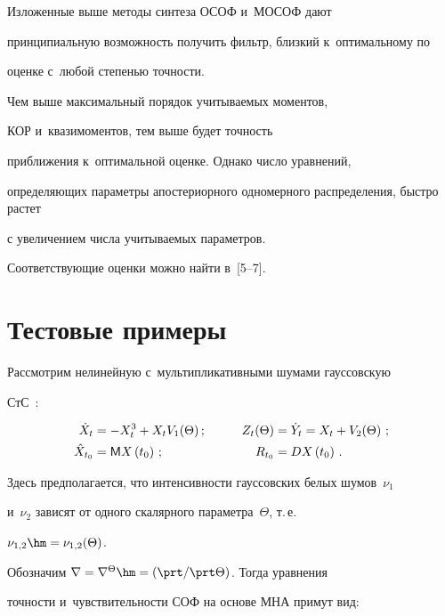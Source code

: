 Изложенные выше методы синтеза ОСОФ и~МОСОФ дают

принципиальную возможность получить фильтр, близкий к~оптимальному по

оценке с~любой степенью точности.

Чем выше максимальный порядок учитываемых моментов,

КОР и~квазимоментов, тем выше будет точность

приближения к~оптимальной оценке. Однако число уравнений,

определяющих параметры апостериорного одномерного распределения, быстро растет

с увеличением числа учитываемых параметров.

Соответствующие оценки можно найти в~[5--7]. %



\section{Тестовые примеры}





Рассмотрим нелинейную с~мультипликативными шумами гауссовскую\linebreak  

СтС~\cite{3-s1, 4-s1}:

\begin{alignat*}{2}

\dot X_t &=- X_t^3 + X_t V_1(\Theta)\,;&\qquad Z_t (\Theta) &= \dot Y_t= X_t + V_2(\Theta)\,\,;


\\

\hat X_{t_0} &= {\sf M} X\left(t_0\right)\,;&\qquad R_{t_0}& = DX\left(t_0\right)\,.


\end{alignat*}

Здесь предполагается, что  интенсивности гауссовских белых шумов~$\nu_1$ 

и~$\nu_2$ зависят от одного скалярного параметра~$\Theta$, т.\,е.\

 $\nu_{1,2}\hm = \nu_{1,2} (\Theta)$.



Обозначим $\nabla =\nabla^\Theta\hm= (\prt / \prt \Theta)$. Тогда уравнения 

точности и~чувст\-ви\-тель\-ности СОФ на основе МНА примут вид:

